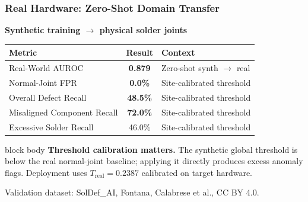 \documentclass[aspectratio=169,11pt]{beamer}
\newcommand{\emphred}[1]{\textcolor{secondary}{#1}}
\newcommand{\good}[1]{\textcolor{accent}{\textbf{#1}}}
\begin{document}
\begin{frame}\frametitle{\emphred{Real Hardware: Zero-Shot Domain Transfer}}

\begin{center}
\small
\textbf{Synthetic training $\rightarrow$ physical solder joints}
\end{center}

\vspace{0.1cm}

\begin{center}
\footnotesize
\begin{tabular}{|l|c|l|}
\hline
\textbf{Metric} & \textbf{Result} & \textbf{Context} \\
\hline
Real-World AUROC & \good{0.879} & Zero-shot synth $\rightarrow$ real \\
\hline
Normal-Joint FPR & \good{0.0\%} & Site-calibrated threshold \\
\hline
Overall Defect Recall & \good{48.5\%} & Site-calibrated threshold \\
\hline
Misaligned Component Recall & \good{72.0\%} & Site-calibrated threshold \\
\hline
Excessive Solder Recall & 46.0\% & Site-calibrated threshold \\
\hline
\end{tabular}
\end{center}

\vspace{0.12cm}

\begin{beamercolorbox}[
    wd=0.91\paperwidth,
    rounded=true,
    shadow=true,
    sep=0.3em
  ]{block body}
\scriptsize
\textbf{Threshold calibration matters.}
The synthetic global threshold is below the real normal-joint
baseline; applying it directly produces excess anomaly flags.
Deployment uses $T_{\mathrm{real}} = 0.2387$ calibrated on target hardware.
\end{beamercolorbox}

\vspace{0.08cm}

{\tiny
Validation dataset: SolDef\_AI, Fontana, Calabrese et al., CC BY 4.0.
}

\end{frame}
\end{document}
